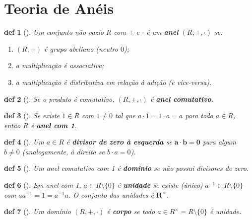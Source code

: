 \documentclass[11pt]{article}
\newcommand{\defname}[1]{\colorbox{yellow!30}{\strut \textbf{#1}}}
\newtheorem*{definition}{def}
\theoremstyle{definition}
\begin{document}
\section{Teoria de Anéis}
\begin{multicols}{3}


\begin{definition}[\defname{Anel}]
Um conjunto não vazio $R$ com $+$ e $\cdot$ é um \textbf{anel} \((R,+,\cdot)\) se:
\begin{enumerate}[label=(\roman*)]
\item $(R,+)$ é grupo abeliano (neutro $0$);
\item a multiplicação é associativa;
\item a multiplicação é distributiva em relação à adição (e vice-versa).
\end{enumerate}
\end{definition}

\begin{definition}[\defname{Anel Comutativo}]
Se o produto é comutativo, $(R,+,\cdot)$ é \textbf{anel comutativo}.
\end{definition}

\begin{definition}[\defname{Anel com 1}]
Se existe \(1\in R\) com \(1\neq 0\) tal que \(a\cdot 1=1\cdot a=a\) para todo \(a\in R\), então $R$ é \textbf{anel com 1}.
\end{definition}

\begin{definition}[\defname{Divisor de Zero}]
Um \(a\in R\) é \textbf{divisor de zero à esquerda} se \(\mathbf{a\cdot b=0}\) para algum \(b\neq 0\) (analogamente, à direita se \(b\cdot a=0\)).
\end{definition}

\begin{definition}[\defname{Domínio}]
Um anel comutativo com 1 é \textbf{domínio} se não possui divisores de zero.
\end{definition}

\begin{definition}[\defname{Unidade}]
Em anel com 1, \(a\in R\setminus\{0\}\) é \textbf{unidade} se existe (único) \(a^{-1}\in R\setminus\{0\}\) com \(a a^{-1}=1=a^{-1}a\). O conjunto das unidades é \(\mathbf{R^\times}\).
\end{definition}

\begin{definition}[\defname{Corpo}]
Um domínio \((R,+,\cdot)\) é \textbf{corpo} se todo \(a\in R^\times=R\setminus\{0\}\) é unidade.
\end{definition}


\end{multicols}
\end{document}
